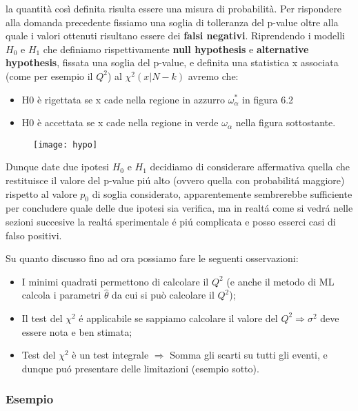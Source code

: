 \noindent la quantit\`{a} cos\`{i} definita risulta essere una misura di probabilit\`{a}. Per rispondere alla domanda precedente fissiamo una soglia di tolleranza del p-value oltre alla quale i valori ottenuti risultano essere dei \textbf{falsi negativi}. Riprendendo i modelli $H_0$ e $H_1$ che definiamo rispettivamente \textbf{null hypothesis} e \textbf{alternative hypothesis}, fissata una soglia del p-value, e definita una statistica x associata (come per esempio il $Q^2$) al $\chi^2(x \vert N-k)$ avremo che:
\begin{itemize}
	\item H0 \`{e} rigettata se x cade nella regione in azzurro $\omega_\alpha^* $ in figura 6.2
	\item H0 \`{e} accettata se x cade nella regione in verde $\omega_\alpha$ nella figura sottostante.
\end{itemize}
\begin{figure}[ht]
\texttt{[image: hypo]}	
\centering
\end{figure}
Dunque date due ipotesi $H_0$ e $H_1$ decidiamo di considerare affermativa quella che restituisce il valore del p-value pi\'{u} alto (ovvero quella con probabilit\'{a} maggiore) rispetto al valore $p_0$ di soglia considerato, apparentemente sembrerebbe sufficiente per concludere quale delle due ipotesi sia verifica, ma in realt\'{a} come si vedr\'{a} nelle sezioni succesive la realt\'{a} sperimentale \'{e} pi\'{u} complicata e posso esserci casi di falso positivi.

\noindent Su quanto discusso fino ad ora possiamo fare le seguenti osservazioni:
\begin{itemize}
	\item I minimi quadrati permettono di calcolare il $Q^2$ (e anche il metodo di ML calcola i parametri $\hat{\theta}$ da cui si può calcolare il $Q^2$);
	\item Il test del $\chi^2$ \'{e} applicabile se sappiamo calcolare il valore del $Q^2 \Rightarrow \sigma^2$  deve essere nota e ben stimata;
	\item Test del $\chi^2$ \`{e} un test integrale $\Rightarrow$ Somma gli scarti su tutti gli eventi, e dunque pu\'{o} presentare delle limitazioni (esempio sotto).
\end{itemize}

\subsubsection{Esempio}

